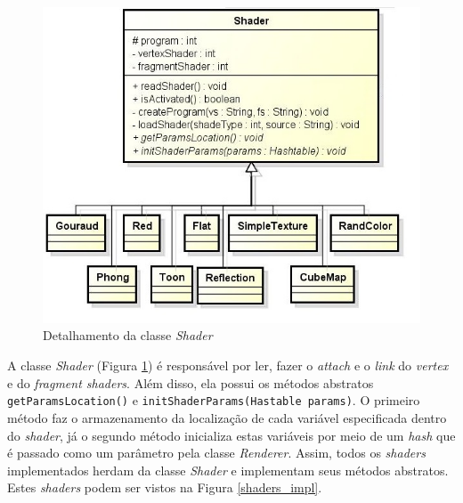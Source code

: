 	\begin{figure}[ht]
	\centering
		\includegraphics[keepaspectratio=true,scale=0.6]{figuras/shaders_diag.jpg}
	\caption{Detalhamento da classe \textit{Shader}}
	\label{shaders_diag}
	\end{figure}

	A classe \textit{Shader} (Figura \ref{shaders_diag}) é responsável por ler, fazer o \textit{attach} e o \textit{link} do \textit{ vertex} e do \textit{fragment shaders}. Além disso, ela possui os métodos abstratos \texttt{getParamsLocation()} e \texttt{initShaderParams(Hastable params)}. O primeiro método faz o armazenamento da localização de cada variável especificada dentro do \textit{shader}, já o segundo método inicializa estas variáveis por meio de um \textit{hash} que é passado como um parâmetro pela classe \textit{Renderer}. Assim, todos os \textit{shaders} implementados herdam da classe \textit{Shader} e implementam seus métodos abstratos. Estes \textit{shaders} podem ser vistos na Figura \ref{shaders_impl}.  

